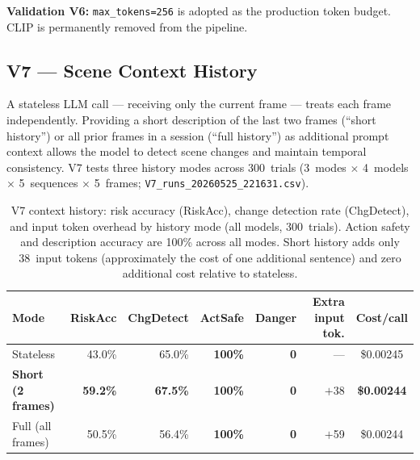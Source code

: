 \textbf{Validation V6:} \texttt{max\_tokens=256} is adopted as the production
token budget. CLIP is permanently removed from the pipeline.

\subsection{V7 --- Scene Context History}
\label{sec:ch2_v7}

A stateless LLM call --- receiving only the current frame --- treats each
frame independently. Providing a short description of the last two frames
(``short history'') or all prior frames in a session (``full history'') as
additional prompt context allows the model to detect scene changes and maintain
temporal consistency. V7 tests three history modes across 300~trials
(3~modes $\times$ 4~models $\times$ 5~sequences $\times$ 5~frames;
\texttt{V7\_runs\_20260525\_221631.csv}).

\begin{table}[ht]
  \caption{V7 context history: risk accuracy (RiskAcc), change detection rate
    (ChgDetect), and input token overhead by history mode (all models,
    300~trials). Action safety and description accuracy are 100\% across all
    modes. Short history adds only 38~input tokens (approximately the cost
    of one additional sentence) and zero additional cost relative to stateless.}
  \label{tab:ch2_v7_summary}
  \centering
  \small
  \begin{tabular}{lrrrrrc}
    \toprule
    Mode & RiskAcc & ChgDetect & ActSafe & Danger & Extra input tok. & Cost/call \\
    \midrule
    Stateless      & 43.0\% & 65.0\% & \textbf{100\%} & \textbf{0} & --- & \$0.00245 \\
    \textbf{Short (2 frames)} & \textbf{59.2\%} & \textbf{67.5\%} & \textbf{100\%} & \textbf{0} & $+$38 & \textbf{\$0.00244} \\
    Full (all frames) & 50.5\% & 56.4\% & \textbf{100\%} & \textbf{0} & $+$59 & \$0.00244 \\
    \bottomrule
  \end{tabular}
\end{table}

